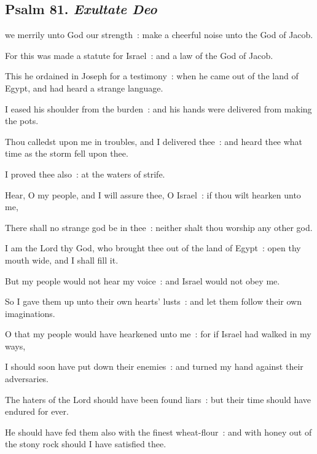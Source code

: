 \subsection{Psalm 81. \textit{Exultate Deo}}


 we merrily unto God our strength~: make a cheerful noise unto the God of Jacob.\par
{}
For this was made a statute for Israel~: and a law of the God of Jacob.\par
{}This he ordained in Joseph for a testimony~: when he came out of the land of Egypt, and had heard a strange language.\par
{}I eased his shoulder from the burden~: and his hands were delivered from making the pots.\par
{}Thou calledst upon me in troubles, and I delivered thee~: and heard thee what time as the storm fell upon thee.\par
{}I proved thee also~: at the waters of strife.\par
{}Hear, O my people, and I will assure thee, O Israel~: if thou wilt hearken unto me,\par
{}There shall no strange god be in thee~: neither shalt thou worship any other god.\par
{}I am the Lord thy God, who brought thee out of the land of Egypt~: open thy mouth wide, and I shall fill it.\par
{}But my people would not hear my voice~: and Israel would not obey me.\par
{}So I gave them up unto their own hearts' lusts~: and let them follow their own imaginations.\par
{}O that my people would have hearkened unto me~: for if Israel had walked in my ways,\par
{}I should soon have put down their enemies~: and turned my hand against their adversaries.\par
{}The haters of the Lord should have been found liars~: but their time should have endured for ever.\par
{}He should have fed them also with the finest wheat-flour~: and with honey out of the stony rock should I have satisfied thee.\par

